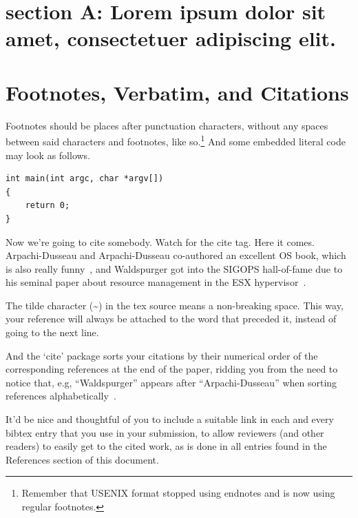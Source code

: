 \section{section A: Lorem ipsum dolor sit amet, consectetuer adipiscing elit.}

\section{Footnotes, Verbatim, and Citations}

Footnotes should be places after punctuation characters, without any spaces between said characters and footnotes, like so.\footnote{Remember that USENIX format stopped using endnotes and is now using regular footnotes.} And some embedded literal code may look as follows.\par

\begin{verbatim}
int main(int argc, char *argv[]) 
{
    return 0;
}
\end{verbatim}

Now we're going to cite somebody. Watch for the cite tag. Here it comes. Arpachi-Dusseau and Arpachi-Dusseau co-authored an excellent OS book, which is also really funny~\cite{arpachiDusseau18:osbook}, and Waldspurger got into the SIGOPS hall-of-fame due to his seminal paper about resource management in the ESX hypervisor~\cite{waldspurger02}.\par

The tilde character (\~{}) in the tex source means a non-breaking space. This way, your reference will always be attached to the word that preceded it, instead of going to the next line.\par

And the `cite' package sorts your citations by their numerical order of the corresponding references at the end of the paper, ridding you from the need to notice that, e.g, ``Waldspurger'' appears after ``Arpachi-Dusseau'' when sorting references alphabetically~\cite{waldspurger02,arpachiDusseau18:osbook}.\par

It'd be nice and thoughtful of you to include a suitable link in each and every bibtex entry that you use in your submission, to allow reviewers (and other readers) to easily get to the cited work, as is done in all entries found in the References section of this document.\par

